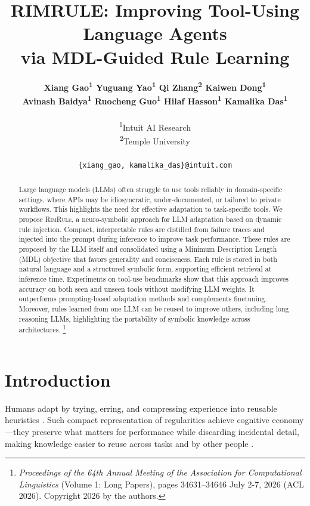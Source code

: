 \documentclass[11pt]{article}
\title{R{\normalsize IM}R{\normalsize ULE}: Improving Tool-Using Language Agents\\via MDL-Guided Rule Learning}
\author{
{\bfseries
Xiang Gao\textsuperscript{1} \quad
Yuguang Yao\textsuperscript{1} \quad
Qi Zhang\textsuperscript{2} \quad
Kaiwen Dong\textsuperscript{1}
}\\
{\bfseries
Avinash Baidya\textsuperscript{1} \quad
Ruocheng Guo\textsuperscript{1} \quad
Hilaf Hasson\textsuperscript{1} \quad
Kamalika Das\textsuperscript{1}
}\\
\\
\textsuperscript{1}Intuit AI Research \\
\textsuperscript{2}Temple University \\
\\
\texttt{\{xiang\_gao, kamalika\_das\}@intuit.com}
}
\newcommand{\shortname}{\textsc{RimRule}\xspace}
\begin{document}
\maketitle

\begin{abstract}

Large language models (LLMs) often struggle to use tools reliably in domain-specific settings, where APIs may be idiosyncratic, under-documented, or tailored to private workflows. This highlights the need for effective adaptation to task-specific tools. We propose \shortname, a neuro-symbolic approach for LLM adaptation based on dynamic rule injection. Compact, interpretable rules are distilled from failure traces and injected into the prompt during inference to improve task performance. These rules are proposed by the LLM itself and consolidated using a Minimum Description Length (MDL) objective that favors generality and conciseness. Each rule is stored in both natural language and a structured symbolic form, supporting efficient retrieval at inference time. Experiments on tool-use benchmarks show that this approach improves accuracy on both seen and unseen tools without modifying LLM weights. It outperforms prompting-based adaptation methods and complements finetuning. Moreover, rules learned from one LLM can be reused to improve others, including long reasoning LLMs, highlighting the portability of symbolic knowledge across architectures.%
\footnote{\emph{Proceedings of the 64th Annual Meeting of the Association for Computational Linguistics} (Volume 1: Long Papers), pages 34631–34646
July 2-7, 2026 (ACL 2026). Copyright 2026
by the authors.}



\end{abstract}


\section{Introduction}

Humans adapt by trying, erring, and compressing experience into reusable heuristics \citep{kolb1984experiential,metcalfe2017learning,gigerenzer2011heuristic}.
Such compact representation of regularities achieve cognitive economy---they preserve what matters for performance while discarding incidental detail, making knowledge easier to reuse across tasks and by other people \citep{rosch1978principles}. 
\end{document}
